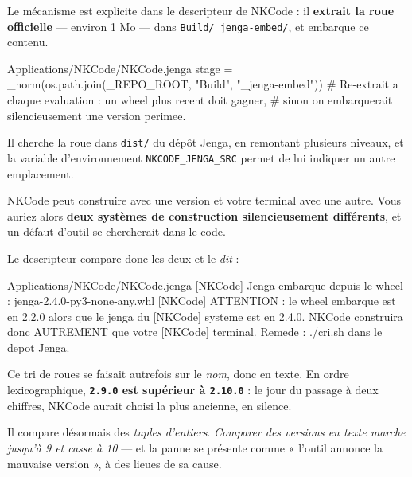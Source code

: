 \begin{nkretenir}
Le mécanisme est explicite dans le descripteur de NKCode : il \textbf{extrait la
roue officielle} --- environ 1 Mo --- dans \texttt{Build/\_jenga-embed/}, et
embarque ce contenu.

\begin{nkcode}{Applications/NKCode/NKCode.jenga}
stage = _norm(os.path.join(_REPO_ROOT, "Build", "_jenga-embed"))
# Re-extrait a chaque evaluation : un wheel plus recent doit gagner,
# sinon on embarquerait silencieusement une version perimee.
\end{nkcode}

Il cherche la roue dans \texttt{dist/} du dépôt Jenga, en remontant plusieurs
niveaux, et la variable d'environnement \texttt{NKCODE\_JENGA\_SRC} permet de
lui indiquer un autre emplacement.
\end{nkretenir}

\begin{nkpiege}
NKCode peut construire avec une version et votre terminal avec une autre. Vous
auriez alors \textbf{deux systèmes de construction silencieusement différents},
et un défaut d'outil se chercherait dans le code.

Le descripteur compare donc les deux et le \emph{dit} :

\begin{nkcode}{Applications/NKCode/NKCode.jenga}
[NKCode] Jenga embarque depuis le wheel : jenga-2.4.0-py3-none-any.whl
[NKCode] ATTENTION : le wheel embarque est en 2.2.0 alors que le jenga du
[NKCode]   systeme est en 2.4.0. NKCode construira donc AUTREMENT que votre
[NKCode]   terminal. Remede : ./cri.sh dans le depot Jenga.
\end{nkcode}
\end{nkpiege}

\begin{nkretenir}
Ce tri de roues se faisait autrefois sur le \emph{nom}, donc en texte. En ordre
lexicographique, \textbf{\texttt{2.9.0} est supérieur à \texttt{2.10.0}} : le
jour du passage à deux chiffres, NKCode aurait choisi la plus ancienne, en
silence.

Il compare désormais des \emph{tuples d'entiers}. \emph{Comparer des versions en
texte marche jusqu'à 9 et casse à 10} --- et la panne se présente comme « l'outil
annonce la mauvaise version », à des lieues de sa cause.
\end{nkretenir}

